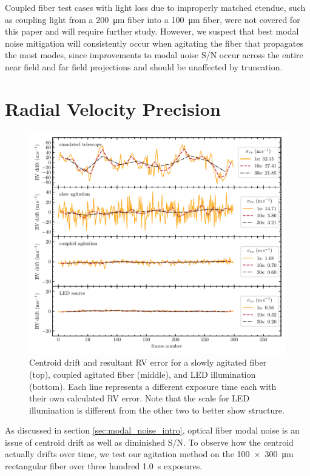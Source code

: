 \documentclass[twocolumn]{emulateapj}
\begin{document}
Coupled fiber test cases with light loss due to improperly matched etendue, such as coupling light from a \SI{200}{\micro\meter} fiber into a \SI{100}{\micro\meter} fiber, were not covered for this paper and will require further study. However, we suspect that best modal noise mitigation will consistently occur when agitating the fiber that propagates the most modes, since improvements to modal noise S/N occur across the entire near field and far field projections and should be unaffected by truncation.

\section{Radial Velocity Precision}
\label{sec:rv_precision}

\begin{figure}
\centering
	\includegraphics[width=\textwidth]{images/rv_error.pdf}
	\caption{Centroid drift and resultant RV error for a slowly agitated fiber (top), coupled agitated fiber (middle), and LED illumination (bottom). Each line represents a different exposure time each with their own calculated RV error. Note that the scale for LED illumination is different from the other two to better show structure.}
\label{fig:rv_error}
\end{figure}

As discussed in section \ref{sec:modal_noise_intro}, optical fiber modal noise is an issue of centroid drift as well as diminished S/N. To observe how the centroid actually drifts over time, we test our agitation method on the \SI{100x300}{\micro\meter} rectangular fiber over three hundred \SI{1.0}{\second} exposures.
\end{document}
